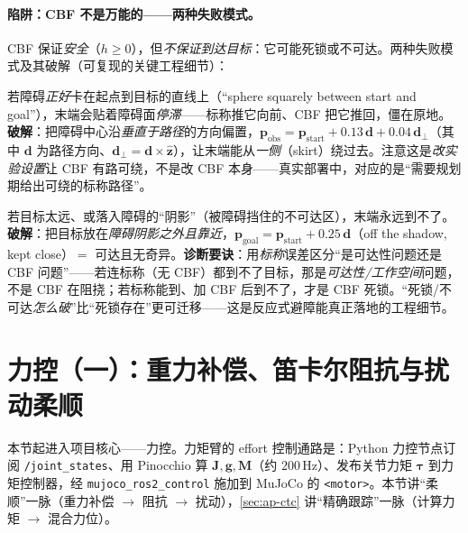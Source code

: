 \paragraph{陷阱：CBF 不是万能的——两种失败模式。}
CBF 保证\emph{安全}（$h\ge0$），但\emph{不保证到达目标}：它可能死锁或不可达。两种失败模式及其破解（可复现的关键工程细节）：

\begin{pitfall}\label{pit:ap-cbf-deadlock}
若障碍\emph{正好}卡在起点到目标的直线上（“sphere squarely between start and goal”），末端会贴着障碍面\emph{停滞}——标称推它向前、CBF 把它推回，僵在原地。\textbf{破解}：把障碍中心沿\emph{垂直于路径}的方向偏置，$\mathbf{p}_{\mathrm{obs}}=\mathbf{p}_{\mathrm{start}}+0.13\,\mathbf{d}+0.04\,\mathbf{d}_\perp$（其中 $\mathbf{d}$ 为路径方向、$\mathbf{d}_\perp=\mathbf{d}\times\hat{\mathbf{z}}$），让末端能从\emph{一侧}（skirt）绕过去。注意这是\emph{改实验设置}让 CBF 有路可绕，不是改 CBF 本身——真实部署中，对应的是“需要规划期给出可绕的标称路径”。
\end{pitfall}

\begin{pitfall}\label{pit:ap-cbf-unreach}
若目标太远、或落入障碍的“阴影”（被障碍挡住的不可达区），末端永远到不了。\textbf{破解}：把目标放在\emph{障碍阴影之外且靠近}，$\mathbf{p}_{\mathrm{goal}}=\mathbf{p}_{\mathrm{start}}+0.25\,\mathbf{d}$（off the shadow, kept close）$=$ 可达且无奇异。\textbf{诊断要诀}：用\emph{标称}误差区分“是可达性问题还是 CBF 问题”——若连标称（无 CBF）都到不了目标，那是\emph{可达性/工作空间}问题，不是 CBF 在阻挠；若标称能到、加 CBF 后到不了，才是 CBF 死锁。“死锁/不可达\emph{怎么破}”比“死锁存在”更可迁移——这是反应式避障能真正落地的工程细节。
\end{pitfall}

\section{力控（一）：重力补偿、笛卡尔阻抗与扰动柔顺}
\label{sec:ap-impedance}

本节起进入项目核心——力控。力矩臂的 effort 控制通路是：Python 力控节点订阅 \texttt{/\allowbreak joint\_states}、用 Pinocchio 算 $\mathbf{J},\mathbf{g},\mathbf{M}$（约 $200\,\mathrm{Hz}$）、发布关节力矩 $\boldsymbol{\tau}$ 到力矩控制器，经 \texttt{mujoco\_ros2\_control} 施加到 MuJoCo 的 \texttt{<motor>}。本节讲“柔顺”一脉（重力补偿 $\to$ 阻抗 $\to$ 扰动），\cref{sec:ap-ctc} 讲“精确跟踪”一脉（计算力矩 $\to$ 混合力位）。

